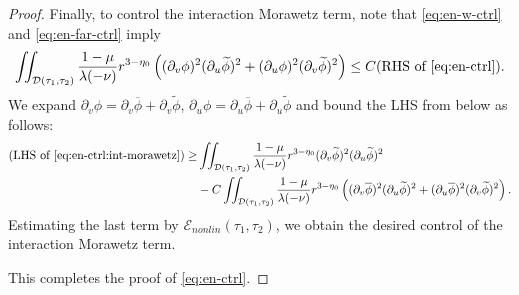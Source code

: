 \documentclass[10pt, reqno]{amsart}
\theoremstyle{definition}
\theoremstyle{remark}
\theoremstyle{conjecture}
\numberwithin{equation}{section}
\newcommand{\rd}{\partial}
\newcommand{\0}{\emptyset}
\newcommand{\lmb}{\lambda}
\newcommand{\calD}{\mathcal D}
\newcommand{\calE}{\mathcal E}
\newcommand{\dur}{\nu}
\newcommand{\dvr}{\lmb}
\newcommand{\phibg}{\overline{\phi}}				%
\newcommand{\phidf}{\widetilde{\phi}}				%
\begin{document}
\begin{proof}
Finally, to control the interaction Morawetz term, note that \eqref{eq:en-w-ctrl} and \eqref{eq:en-far-ctrl} imply
\begin{equation} \label{eq:en-ctrl:int-morawetz}
	\iint_{\calD(\tau_{1}, \tau_{2})} \frac{1-\mu}{\dvr (-\dur)}  r^{3-\eta_{0}} \left( (\rd_{v} \phi)^{2} (\rd_{u} \phidf)^{2} + (\rd_{u} \phi)^{2} (\rd_{v} \phidf)^{2} \right)  \leq C (\hbox{RHS of \eqref{eq:en-ctrl}}).
\end{equation}
We expand $\rd_{v} \phi = \rd_{v} \phibg + \rd_{v} \phidf$, $\rd_{u} \phi = \rd_{u} \phibg + \rd_{u} \phidf$ and bound the LHS from below as follows:
\begin{align*}
(\hbox{LHS of \eqref{eq:en-ctrl:int-morawetz}}) 
\geq & \iint_{\calD(\tau_{1}, \tau_{2})} \frac{1-\mu}{\dvr (-\dur)}  r^{3-\eta_{0}} (\rd_{v} \phidf)^{2} (\rd_{u} \phidf)^{2} \\
	& - C \iint_{\calD(\tau_{1}, \tau_{2})}  \frac{1-\mu}{\dvr (-\dur)}  r^{3-\eta_{0}} \left( (\rd_{v} \phibg)^{2} (\rd_{u} \phidf)^{2} + (\rd_{u} \phibg)^{2} (\rd_{v} \phidf)^{2} \right).
\end{align*}
Estimating the last term by $\calE_{nonlin} (\tau_1,\tau_2)$, we obtain the desired control of the interaction Morawetz term.

This completes the proof of \eqref{eq:en-ctrl}. \qedhere
\end{proof}
\end{document}
